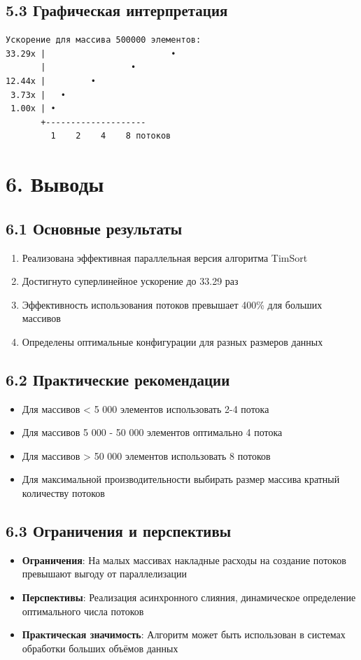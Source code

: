 \documentclass[12pt,a4paper]{article}
\begin{document}
\subsection*{5.3 Графическая интерпретация}

\begin{verbatim}
Ускорение для массива 500000 элементов:
33.29x |                         •
       |                 •
12.44x |         •
 3.73x |   •
 1.00x | •
       +--------------------
         1    2    4    8 потоков
\end{verbatim}

\section*{6. Выводы}

\subsection*{6.1 Основные результаты}
\begin{enumerate}
    \item Реализована эффективная параллельная версия алгоритма TimSort
    \item Достигнуто суперлинейное ускорение до 33.29 раз
    \item Эффективность использования потоков превышает 400\% для больших массивов
    \item Определены оптимальные конфигурации для разных размеров данных
\end{enumerate}

\subsection*{6.2 Практические рекомендации}
\begin{itemize}
    \item Для массивов < 5 000 элементов использовать 2-4 потока
    \item Для массивов 5 000 - 50 000 элементов оптимально 4 потока
    \item Для массивов > 50 000 элементов использовать 8 потоков
    \item Для максимальной производительности выбирать размер массива кратный количеству потоков
\end{itemize}

\subsection*{6.3 Ограничения и перспективы}
\begin{itemize}
    \item \textbf{Ограничения}: На малых массивах накладные расходы на создание потоков превышают выгоду от параллелизации
    \item \textbf{Перспективы}: Реализация асинхронного слияния, динамическое определение оптимального числа потоков
    \item \textbf{Практическая значимость}: Алгоритм может быть использован в системах обработки больших объёмов данных
\end{itemize}
\end{document}

